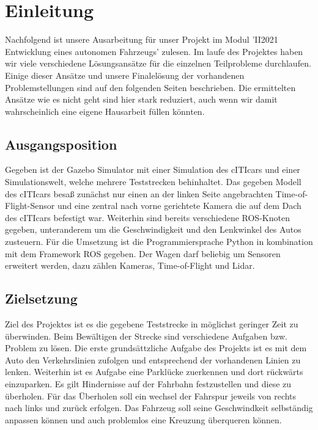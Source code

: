 \section{Einleitung}

Nachfolgend ist unsere Ausarbeitung für unser Projekt im Modul  'II2021 Entwicklung eines autonomen Fahrzeugs' zulesen. Im laufe des Projektes haben wir viele verschiedene Lösungsansätze für die einzelnen Teilprobleme durchlaufen. Einige dieser Ansätze und unsere Finalelösung der vorhandenen Problemstellungen sind auf den folgenden Seiten beschrieben. Die ermittelten Ansätze wie es nicht geht sind hier stark reduziert, auch wenn wir damit wahrscheinlich eine eigene Hausarbeit füllen könnten.

\subsection{Ausgangsposition}
    
Gegeben ist der Gazebo Simulator mit einer Simulation des cITIcars und einer Simulationswelt, welche mehrere Teststrecken behinhaltet. Das gegeben Modell des cITIcars besaß zunächst nur einen an der linken Seite angebrachten Time-of-Flight-Sensor und eine zentral nach vorne gerichtete Kamera die auf dem Dach des cITIcars befestigt war. Weiterhin sind bereits verschiedene ROS-Knoten gegeben, unteranderem um die Geschwindigkeit und den Lenkwinkel des Autos zusteuern. Für die Umsetzung ist die Programmiersprache Python in kombination mit dem Framework ROS gegeben. Der Wagen darf beliebig um Sensoren erweitert werden, dazu zählen Kameras, Time-of-Flight und Lidar.

\subsection{Zielsetzung}

Ziel des Projektes ist es die gegebene Teststrecke in möglichst geringer Zeit zu überwinden. Beim Bewältigen der Strecke sind verschiedene Aufgaben bzw. Problem zu lösen. Die erste grundsättzliche Aufgabe des Projekts ist es mit dem Auto den Verkehrslinien zufolgen und entsprechend der vorhandenen Linien   zu lenken. Weiterhin ist es Aufgabe eine Parklücke zuerkennen und dort rückwärts einzuparken. Es gilt Hindernisse auf der Fahrbahn festzustellen und diese zu überholen. Für das Überholen soll ein wechsel der Fahrspur jeweils von rechts nach links und zurück erfolgen. Das Fahrzeug soll seine Geschwindkeit selbständig anpassen können und auch problemlos eine Kreuzung überqueren können. 
